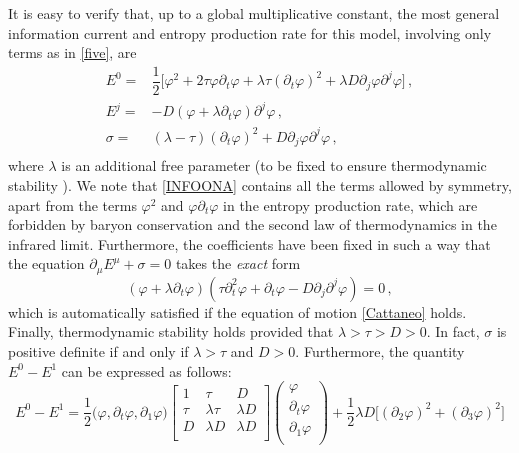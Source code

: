 \documentclass[a4paper, amsfonts, amssymb, amsmath, reprint, showkeys, nofootinbib, twoside,notitlepage,onecolumn,preprintnumbers]{revtex4-2}
\theoremstyle{definition}
\theoremstyle{theorem}
\theoremstyle{corollary}
\begin{document}
It is easy to verify that, up to a global multiplicative constant, the most general information current and entropy production rate for this model, involving only terms as in \eqref{five}, are
\begin{equation}\label{INFOONA}
\begin{split}
E^0 ={}& \dfrac{1}{2} \big[ \varphi^2 + 2 \tau \varphi \partial_t \varphi + \lambda \tau (\partial_t \varphi)^2+ \lambda D \partial_j \varphi \partial^j \varphi \big] \, ,\\
E^j ={}& -D(\varphi + \lambda \partial_t \varphi)\partial^j \varphi \, ,\\
\sigma ={}& (\lambda-\tau)(\partial_t \varphi)^2 + D \partial_j \varphi \partial^j \varphi \, , \\
\end{split}
\end{equation}
where $\lambda$ is an additional free parameter (to be fixed to ensure thermodynamic stability \cite{GavassinoCausality2021}). We note that \eqref{INFOONA} contains all the terms allowed by symmetry, apart from the terms $\varphi^2$ and $\varphi \partial_t \varphi$ in the entropy production rate, which are forbidden by baryon conservation and the second law of thermodynamics in the infrared limit. Furthermore, the coefficients have been fixed in such a way that the equation $\partial_\mu E^\mu +\sigma=0$ takes the \textit{exact} form
\begin{equation}
(\varphi+\lambda \partial_t \varphi)(\tau \partial^2_t \varphi +\partial_t \varphi-D\partial_j \partial^j \varphi)=0 \, ,
\end{equation}
which is automatically satisfied if the equation of motion \eqref{Cattaneo} holds. Finally, thermodynamic stability holds provided that $\lambda>\tau>D>0$. In fact, $\sigma$ is positive definite if and only if $\lambda > \tau$ and $D >0$. Furthermore, the quantity $E^0-E^1$ can be expressed as follows:
\begin{equation}\label{gargarensis}
E^0-E^1 = \dfrac{1}{2} \big(\varphi, \partial_t \varphi, \partial_1 \varphi \big)
\begin{bmatrix}
1 & \tau & D \\
\tau & \lambda \tau & \lambda D \\
D & \lambda D & \lambda D \\
\end{bmatrix}
\begin{pmatrix}
\varphi \\
\partial_t \varphi \\
\partial_1 \varphi \\
\end{pmatrix}
+ \dfrac{1}{2} \lambda D \big[ (\partial_2 \varphi)^2+(\partial_3 \varphi)^2 \big]
\end{equation}
\end{document}

